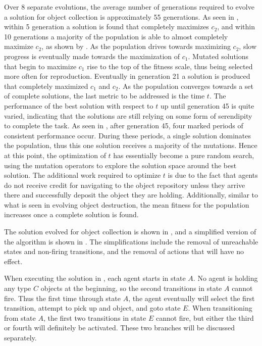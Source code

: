 Over 8 separate evolutions, the average number of generations required to evolve a solution for object collection is approximately 55 generations. As seen in , within 5 generation a solution is found that completely maximizes $c_2$, and within 10 generations a majority of the population is able to almost completely maximize $c_2$, as shown by .  As the population drives towards maximizing $c_2$, slow progress is eventually made towards the maximization of $c_1$.  Mutated solutions that begin to maximize $c_1$ rise to the top of the fitness scale, thus being selected more often for reproduction.  Eventually in generation 21 a solution is produced that completely maximized $c_1$ and $c_2$.  As the population converges towards a set of complete solutions, the last metric to be addressed is the time $t$.  The performance of the best solution with respect to $t$ up until generation 45 is quite varied, indicating that the solutions are still relying on some form of serendipity to complete the task.  As seen in , after generation 45, four marked periods of consistent performance occur.  During these periods, a single solution dominates the population, thus this one solution receives a majority of the mutations.  Hence at this point, the optimization of $t$ has essentially become a pure random search, using the mutation operators to explore the solution space around the best solution.  The additional work required to optimize $t$ is due to the fact that agents do not receive credit for navigating to the object repository unless they arrive there and successfully deposit the object they are holding.  Additionally, similar to what is seen in evolving object destruction, the mean fitness for the population increases once a complete solution is found.  

The solution evolved for object collection is shown in , and a simplified version of the algorithm is shown in .  The simplifications include the removal of unreachable states and non-firing transitions, and the removal of actions that will have no effect.  

When executing the solution in , each agent starts in state $A$.  No agent is holding any type $C$ objects at the beginning, so the second transitions in state $A$ cannot fire.  Thus the first time through state $A$, the agent eventually will select the first transition, attempt to pick up and object, and goto state $E$.  When transitioning from state $A$, the first two transitions in state $E$ cannot fire, but either the third or fourth will definitely be activated.  These two branches will be discussed separately.

